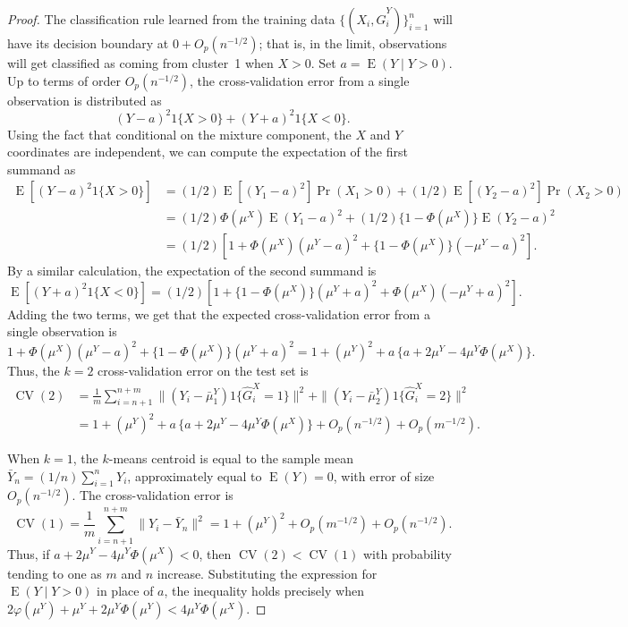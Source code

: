 \documentclass[12pt]{article}
\newcommand{\CV}{\operatorname{CV}}
\newcommand{\E}{\operatorname{E}}
\newcommand{\OhP}{O_p}
\newcommand{\muX}{\mu^{X}}
\newcommand{\muY}{\mu^{Y}}
\newcommand{\bmuY}{\bar \mu^{Y}}
\newcommand{\hGX}{\hat G^{X}}
\newcommand{\hGY}{\hat G^{Y}}
\begin{document}
\begin{proof}
The classification rule learned from the training data
$\{(X_i, \hGY_i)\}_{i=1}^{n}$ will have its decision boundary at $0 + \OhP(n^{-1/2})$;
that is, in the limit,
observations will get classified as coming from cluster~1 when $X > 0$. 
Set $a = \E(Y \mid Y > 0)$.
Up to terms of order $\OhP(n^{-1/2})$,
the cross-validation error from a single observation is distributed as
\[
  (Y - a)^2 1\{ X > 0 \} + (Y + a)^2 1\{X < 0\}.
\]
Using the fact that conditional on the mixture component, the $X$ and $Y$
coordinates are independent, we can compute the expectation of the first
summand as
\begin{align*}
  \E[(Y - a)^2 1\{ X > 0 \}]
  &= (1/2) \E[(Y_1 - a)^2] \Pr(X_1 > 0)
  + (1/2) \E[(Y_2 - a)^2] \Pr(X_2 > 0)
\\
&= (1/2) \Phi(\muX) \E(Y_1 - a)^2  + (1/2) \{ 1 - \Phi(\muX) \} \E(Y_2 - a)^2
\\
&=
(1/2) [ 1  + \Phi(\muX) (\muY - a)^2 + \{ 1 - \Phi(\muX) \} (-\muY - a)^2 ].
\end{align*}
By a similar calculation, the expectation of the second summand is
\[
  \E[(Y + a)^2 1\{ X < 0 \}]
  =
  (1/2)[ 1 + \{ 1 - \Phi(\muX) \} (\muY + a)^2 + \Phi(\muX) (-\muY + a)^2 ].
\]
Adding the two terms, we get that the expected cross-validation error from a
single observation is
\[
  1 + \Phi(\muX) (\muY - a)^2 + \{ 1 - \Phi(\muX) \} (\muY + a)^2
    =
  1 + (\muY)^2 + a \, \{  a + 2 \muY - 4 \muY \Phi(\muX) \}.
\]
Thus, the $k = 2$ cross-validation error on the test set is
\begin{align*}
  \CV(2)
  &=
    \frac{1}{m}
    \sum_{i=n+1}^{n+m}
      \| (Y_i - \bmuY_1) 1\{\hGX_i = 1\} \|^2
      +
      \| (Y_i - \bmuY_2) 1\{\hGX_i = 2\} \|^2
\\
&=
1 + (\muY)^2 +  a \, \{ a + 2 \muY - 4 \muY \Phi(\muX) \}
+ \OhP(n^{-1/2}) + \OhP(m^{-1/2}).
\end{align*}


When $k=1$, the $k$-means centroid is equal to the sample mean $\bar Y_n = (1/n)
\sum_{i=1}^{n} Y_i$, approximately equal to 
$\E(Y) = 0$, with error of size $\OhP(n^{-1/2})$. The cross-validation error is
\[
  \CV(1) = \frac{1}{m} \sum_{i=n+1}^{n+m} \| Y_i - \bar Y_n \|^2
         = 1 + (\mu^Y)^2 + \OhP(m^{-1/2}) + \OhP(n^{-1/2}).
\]
Thus, if $a + 2 \muY - 4 \muY \Phi(\muX) < 0$, then $\CV(2) < \CV(1)$ with
probability tending to one as $m$ and $n$ increase. Substituting the
expression for $\E(Y \mid Y > 0)$ in place of $a$, the inequality holds
precisely when
\(
  2 \varphi(\muY) + \muY + 2 \muY \Phi(\muY) < 4 \muY \Phi(\muX).
\)
\end{proof}
\end{document}
